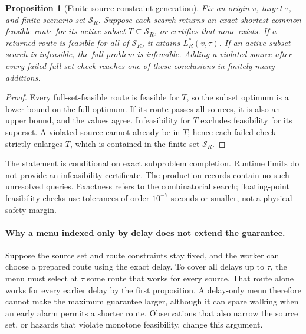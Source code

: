 \documentclass[11pt,a4paper]{article}
\newtheorem{proposition}{Proposition}
\newcommand{\Sc}{\mathcal{S}}
\begin{document}
\begin{proposition}[Finite-source constraint generation]
Fix an origin $v$, target $\tau$, and finite scenario set $\Sc_R$. Suppose each search returns an exact shortest common feasible route for its active subset $T\subseteq\Sc_R$, or certifies that none exists. If a returned route is feasible for all of $\Sc_R$, it attains $L_R^*(v,\tau)$. If an active-subset search is infeasible, the full problem is infeasible. Adding a violated source after every failed full-set check reaches one of these conclusions in finitely many additions.
\end{proposition}
\begin{proof}
Every full-set-feasible route is feasible for $T$, so the subset optimum is a lower bound on the full optimum. If its route passes all sources, it is also an upper bound, and the values agree. Infeasibility for $T$ excludes feasibility for its superset. A violated source cannot already be in $T$; hence each failed check strictly enlarges $T$, which is contained in the finite set $\Sc_R$.
\end{proof}
The statement is conditional on exact subproblem completion. Runtime limits do not provide an infeasibility certificate. The production records contain no such unresolved queries. Exactness refers to the combinatorial search; floating-point feasibility checks use tolerances of order $10^{-7}$ seconds or smaller, not a physical safety margin.

\paragraph{Why a menu indexed only by delay does not extend the guarantee.}
Suppose the source set and route constraints stay fixed, and the worker can choose a prepared route using the exact delay. To cover all delays up to $\tau$, the menu must select at $\tau$ some route that works for every source. That route alone works for every earlier delay by the first proposition. A delay-only menu therefore cannot make the maximum guarantee larger, although it can spare walking when an early alarm permits a shorter route. Observations that also narrow the source set, or hazards that violate monotone feasibility, change this argument.
\end{document}
